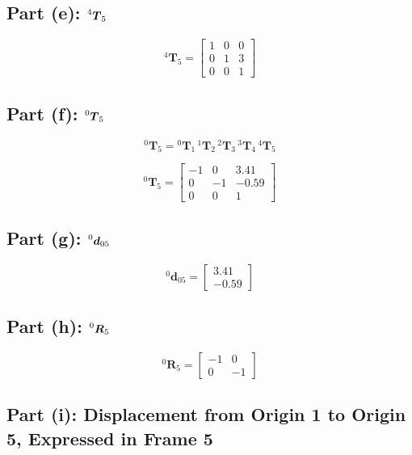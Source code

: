 \documentclass[11pt]{article}
\newcommand{\T}{\bm{T}}
\newcommand{\R}{\bm{R}}
\newcommand{\dvec}{\bm{d}}
\begin{document}
\subsection*{Part (e): $\prescript{4}{}{\T}_{5}$}
\begin{result}
\[
    ^{4}\T_5 = \begin{bmatrix}1 & 0 & 0 \\ 0 & 1 & 3 \\ 0 & 0 & 1\end{bmatrix}
\]
\end{result}

\subsection*{Part (f): $\prescript{0}{}{\T}_{5}$}
\[
    ^{0}\T_5 = {}^{0}\T_1\,{}^{1}\T_2\,{}^{2}\T_3\,{}^{3}\T_4\,{}^{4}\T_5
\]
\begin{result}
\[
    ^{0}\T_5 = \begin{bmatrix}-1 & 0 & 3.41 \\ 0 & -1 & -0.59 \\ 0 & 0 & 1\end{bmatrix}
\]
\end{result}

\subsection*{Part (g): $\prescript{0}{}{\dvec}_{05}$}
\begin{result}
\[
    ^{0}\dvec_{05} = \begin{bmatrix}3.41\\-0.59\end{bmatrix}
\]
\end{result}

\subsection*{Part (h): $\prescript{0}{}{\R}_{5}$}
\begin{result}
\[
    ^{0}\R_5 = \begin{bmatrix}-1 & 0 \\ 0 & -1\end{bmatrix}
\]
\end{result}

\subsection*{Part (i): Displacement from Origin 1 to Origin 5, Expressed in Frame 5}
\end{document}
